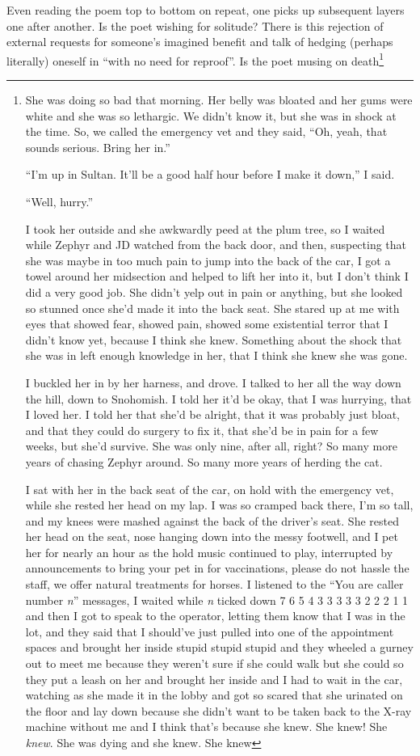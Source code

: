 \documentclass[12pt,oneside]{memoir}
\begin{document}
Even reading the poem top to bottom on repeat, one picks up subsequent layers one after another. Is the poet wishing for solitude? There is this rejection of external requests for someone's imagined benefit and talk of hedging (perhaps literally) oneself in ``with no need for reproof''. Is the poet musing on death\footnote{She was doing so bad that morning. Her belly was bloated and her gums were white and she was so lethargic. We didn't know it, but she was in shock at the time. So, we called the emergency vet and they said, ``Oh, yeah, that sounds serious. Bring her in.''\par
``I'm up in Sultan. It'll be a good half hour before I make it down,'' I said.\par
``Well, hurry.''\par
I took her outside and she awkwardly peed at the plum tree, so I waited while Zephyr and JD watched from the back door, and then, suspecting that she was maybe in too much pain to jump into the back of the car, I got a towel around her midsection and helped to lift her into it, but I don't think I did a very good job. She didn't yelp out in pain or anything, but she looked so stunned once she'd made it into the back seat. She stared up at me with eyes that showed fear, showed pain, showed some existential terror that I didn't know yet, because I think she knew. Something about the shock that she was in left enough knowledge in her, that I think she knew she was gone.\par
I buckled her in by her harness, and drove. I talked to her all the way down the hill, down to Snohomish. I told her it'd be okay, that I was hurrying, that I loved her. I told her that she'd be alright, that it was probably just bloat, and that they could do surgery to fix it, that she'd be in pain for a few weeks, but she'd survive. She was only nine, after all, right? So many more years of chasing Zephyr around. So many more years of herding the cat.\footnotemark\par
I sat with her in the back seat of the car, on hold with the emergency vet, while she rested her head on my lap. I was so cramped back there, I'm so tall, and my knees were mashed against the back of the driver's seat. She rested her head on the seat, nose hanging down into the messy footwell, and I pet her for nearly an hour as the hold music continued to play, interrupted by announcements to bring your pet in for vaccinations, please do not hassle the staff, we offer natural treatments for horses. I listened to the ``You are caller number \emph{n}'' messages, I waited while \emph{n} ticked down 7 6 5 4 3 3 3 3 3 2 2 2 1 1 and then I got to speak to the operator, letting them know that I was in the lot, and they said that I should've just pulled into one of the appointment spaces and brought her inside stupid stupid stupid and they wheeled a gurney out to meet me because they weren't sure if she could walk but she could so they put a leash on her and brought her inside and I had to wait in the car, watching as she made it in the lobby and got so scared that she urinated on the floor and lay down because she didn't want to be taken back to the X-ray machine without me and I think that's because she knew. She knew! She \emph{knew}. She was dying and she knew. She knew \par 
}
\end{document}
